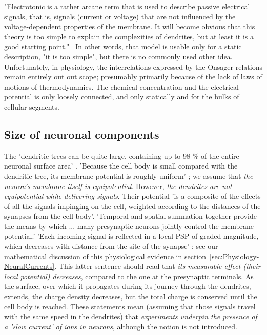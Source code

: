 "Electrotonic is a rather arcane term
that is used to describe passive electrical signals, that is, signals (current
or voltage) that are not influenced by the voltage-dependent properties
of the membrane. It will become obvious that this theory is too simple
to explain the complexities of dendrites, but at least it is a good starting
point."~\cite{JohnstonWuNeurophysiology:1995} In other words, that model is
usable only for a static description, "it is too simple", but there is no 
commonly used other idea.
Unfortunately, in physiology, the interrelations expressed by the Onsager-relations remain entirely out out scope; presumably primarily because of the lack of 
laws of motions of thermodynamics.
The chemical concentration and 
the electrical potential is only loosely connected, and only statically and for the bulks of cellular segments.


\subsection{Size of neuronal components\label{sec:Physiology-Sizes}}
The
'dendritic trees can be quite large, containing up to 98 \% of the
entire neuronal surface area' \cite{BiologicalConservationLaw:2017}.
'Because the cell body is small compared with the dendritic tree,
its membrane potential is roughly uniform' \cite{ MolecularBiology:2002}; 
we assume that \textit{the neuron's membrane itself is equipotential}.
However, \textit{the dendrites are not equipotential while delivering signals}.
Their potential 'is a composite of the effects of all the signals impinging on the cell,
weighted according to the distances of the synapses from the cell body'.
'Temporal and spatial summation together provide the means  by which ...
many presynaptic neurons jointly control the membrane potential.'
'Each incoming signal is reflected in a local \gls{PSP} of graded magnitude,
which decreases with distance from the site of the synapse'  \cite{MolecularBiology:2002}; see our mathematical discussion of this physiological evidence in section~\ref{sec:Physiology-NeuralCurrents}.
This latter sentence should read that \textit{its measurable effect (their local potential)
decreases}, compared to the
one at the presynaptic terminals. As the surface, over which it propagates
during its journey through the dendrites, extends, the charge density decreases,
but the total charge is conserved until the cell body is reached.
These statements mean (assuming that those signals travel with
the same speed in the dendrites) that \textit{ experiments underpin the presence of
a 'slow current' of ions in neurons}, although the notion is not introduced.

